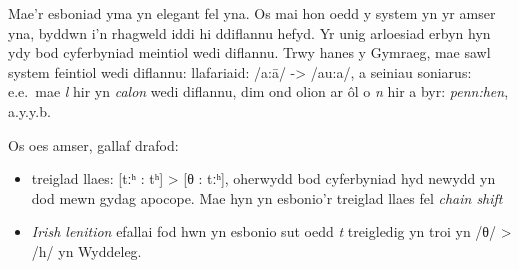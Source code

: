 Mae'r esboniad yma yn elegant fel yna. Os mai hon oedd y system yn yr amser yna, byddwn i'n rhagweld iddi hi ddiflannu hefyd. Yr unig arloesiad erbyn hyn ydy bod cyferbyniad meintiol wedi diflannu. Trwy hanes y Gymraeg, mae sawl system feintiol wedi diflannu: llafariaid: /a:\=a/ -> /au:a/, a seiniau soniarus: e.e.\ mae \textit{l} hir yn \textit{calon} wedi diflannu, dim ond olion ar \^ol o \textit{n} hir a byr: \textit{penn:hen}, a.y.y.b.

Os oes amser, gallaf drafod:
\begin{itemize}
    \item  treiglad llaes: [tːʰ : tʰ] > [θ : tːʰ], oherwydd bod cyferbyniad hyd newydd yn dod mewn gydag apocope. Mae hyn yn esbonio'r treiglad llaes fel \textit{chain shift}
    \item \textit{Irish lenition} efallai fod hwn yn esbonio sut oedd \textit{t} treigledig yn troi yn /θ/ > /h/ yn Wyddeleg.
\end{itemize}






